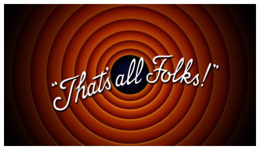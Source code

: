 \documentclass[aspectratio=169]{beamer}
\begin{document}
\begin{frame}[plain]
    \begin{center}
        \includegraphics[height=8cm]{fine.jpg}
    \end{center}
\end{frame}
\end{document}
